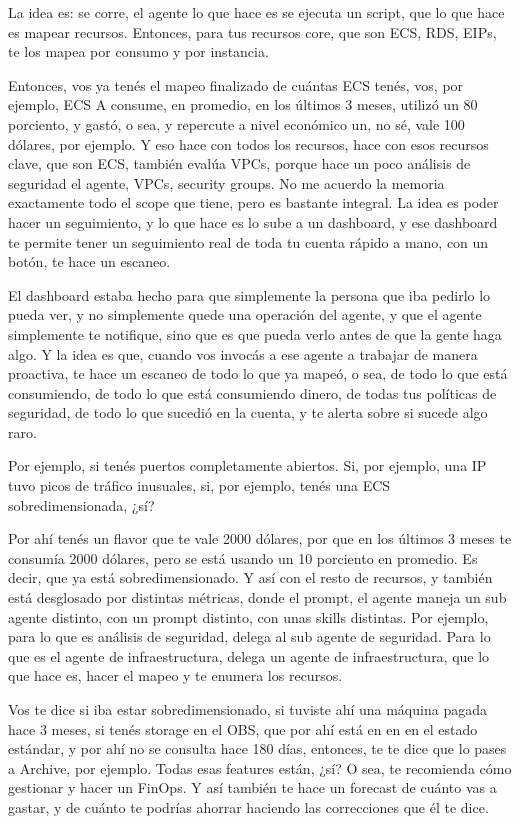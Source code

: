 La idea es: se corre, el agente lo que hace es se ejecuta un script, que lo que hace es mapear recursos. Entonces, para tus recursos core, que son ECS, RDS, EIPs, te los mapea por consumo y por instancia.

Entonces, vos ya tenés el mapeo finalizado de cuántas ECS tenés, vos, por ejemplo, ECS A consume, en promedio, en los últimos 3 meses, utilizó un 80 porciento, y gastó, o sea, y repercute a nivel económico un, no sé, vale 100 dólares, por ejemplo. Y eso hace con todos los recursos, hace con esos recursos clave, que son ECS, también evalúa VPCs, porque hace un poco análisis de seguridad el agente, VPCs, security groups. No me acuerdo la memoria exactamente todo el scope que tiene, pero es bastante integral. La idea es poder hacer un seguimiento, y lo que hace es lo sube a un dashboard, y ese dashboard te permite tener un seguimiento real de toda tu cuenta rápido a mano, con un botón, te hace un escaneo.

El dashboard estaba hecho para que simplemente la persona que iba pedirlo lo pueda ver, y no simplemente quede una operación del agente, y que el agente simplemente te notifique, sino que es que pueda verlo antes de que la gente haga algo. Y la idea es que, cuando vos invocás a ese agente a trabajar de manera proactiva, te hace un escaneo de todo lo que ya mapeó, o sea, de todo lo que está consumiendo, de todo lo que está consumiendo dinero, de todas tus políticas de seguridad, de todo lo que sucedió en la cuenta, y te alerta sobre si sucede algo raro.

Por ejemplo, si tenés puertos completamente abiertos. Si, por ejemplo, una IP tuvo picos de tráfico inusuales, si, por ejemplo, tenés una ECS sobredimensionada, ¿sí?

Por ahí tenés un flavor que te vale 2000 dólares, por que en los últimos 3 meses te consumía 2000 dólares, pero se está usando un 10 porciento en promedio. Es decir, que ya está sobredimensionado. Y así con el resto de recursos, y también está desglosado por distintas métricas, donde el prompt, el agente maneja un sub agente distinto, con un prompt distinto, con unas skills distintas. Por ejemplo, para lo que es análisis de seguridad, delega al sub agente de seguridad. Para lo que es el agente de infraestructura, delega un agente de infraestructura, que lo que hace es, hacer el mapeo y te enumera los recursos.

Vos te dice si iba estar sobredimensionado, si tuviste ahí una máquina pagada hace 3 meses, si tenés storage en el OBS, que por ahí está en en en el estado estándar, y por ahí no se consulta hace 180 días, entonces, te te dice que lo pases a Archive, por ejemplo. Todas esas features están, ¿sí? O sea, te recomienda cómo gestionar y hacer un FinOps. Y así también te hace un forecast de cuánto vas a gastar, y de cuánto te podrías ahorrar haciendo las correcciones que él te dice.

